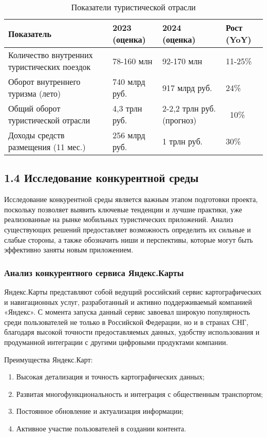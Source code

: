 \begin{table}[h]
\centering
\begin{tabular}{| p{75mm} | p{25mm} | p{25mm} | p{25mm} |}
\hline
\textbf{Показатель} & \textbf{2023 (оценка)} & \textbf{2024 (оценка)} & \textbf{Рост (YoY)} \\
\hline
Количество внутренних туристических поездок & 78-160 млн & 92-170 млн & 11-25\% \\
\hline
Оборот внутреннего туризма (лето) & 740 млрд руб. & 917 млрд руб. & 24\% \\
\hline
Общий оборот туристической отрасли & 4,3 трлн руб. & 2-2,2 трлн руб. (прогноз) & ~10\% \\
\hline
Доходы средств размещения (11 мес.) & 256 млрд руб. & 1 трлн руб. & 30\% \\
\hline
\end{tabular}
\caption{Показатели туристической отрасли}
\end{table}

\subsection*{1.4 Исследование конкурентной среды}

Исследование конкурентной среды является важным этапом подготовки проекта, поскольку позволяет выявить ключевые тенденции и лучшие практики, уже реализованные на рынке мобильных туристических приложений. Анализ существующих решений предоставляет возможность определить их сильные и слабые стороны, а также обозначить ниши и перспективы, которые могут быть эффективно заняты новым приложением.

\subsubsection*{Анализ конкурентного сервиса Яндекс.Карты}
Яндекс.Карты представляют собой ведущий российский сервис картографических и навигационных услуг, разработанный и активно поддерживаемый компанией «Яндекс». С момента запуска данный сервис завоевал широкую популярность среди пользователей не только в Российской Федерации, но и в странах СНГ, благодаря высокой точности предоставляемых данных, удобству использования и продуманной интеграции с другими цифровыми продуктами компании.

Преимущества Яндекс.Карт:
\begin{enumerate}
    \item Высокая детализация и точность картографических данных;
    \item Развитая многофункциональность и интеграция с общественным транспортом;
    \item Постоянное обновление и актуализация информации;
    \item Активное участие пользователей в создании контента.
\end{enumerate}


